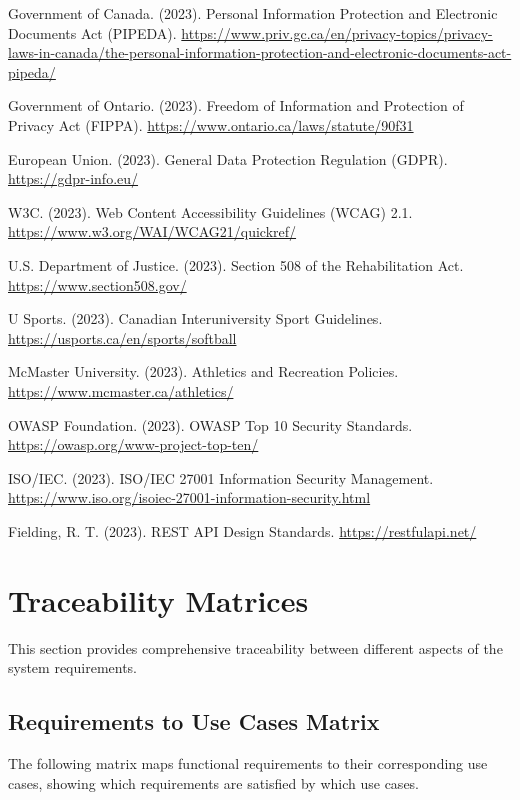 \documentclass[12pt, titlepage]{article}
\begin{document}
\begin{thebibliography}{9}
 Government of Canada. (2023). Personal Information Protection and Electronic Documents Act (PIPEDA). \url{https://www.priv.gc.ca/en/privacy-topics/privacy-laws-in-canada/the-personal-information-protection-and-electronic-documents-act-pipeda/}

 Government of Ontario. (2023). Freedom of Information and Protection of Privacy Act (FIPPA). \url{https://www.ontario.ca/laws/statute/90f31}

 European Union. (2023). General Data Protection Regulation (GDPR). \url{https://gdpr-info.eu/}

 W3C. (2023). Web Content Accessibility Guidelines (WCAG) 2.1. \url{https://www.w3.org/WAI/WCAG21/quickref/}

 U.S. Department of Justice. (2023). Section 508 of the Rehabilitation Act. \url{https://www.section508.gov/}

 U Sports. (2023). Canadian Interuniversity Sport Guidelines. \url{https://usports.ca/en/sports/softball}

 McMaster University. (2023). Athletics and Recreation Policies. \url{https://www.mcmaster.ca/athletics/}

 OWASP Foundation. (2023). OWASP Top 10 Security Standards. \url{https://owasp.org/www-project-top-ten/}

 ISO/IEC. (2023). ISO/IEC 27001 Information Security Management. \url{https://www.iso.org/isoiec-27001-information-security.html}

 Fielding, R. T. (2023). REST API Design Standards. \url{https://restfulapi.net/}
\end{thebibliography}

\section{Traceability Matrices}
This section provides comprehensive traceability between different aspects of the system requirements.

\subsection{Requirements to Use Cases Matrix}
The following matrix maps functional requirements to their corresponding use cases, showing which requirements are satisfied by which use cases.
\end{document}
